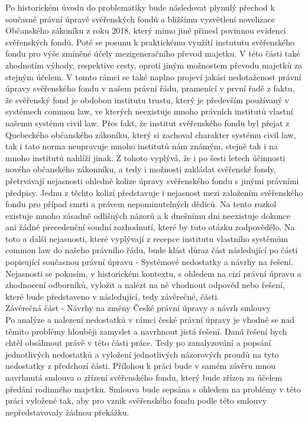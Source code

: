 \documentclass{article}
\begin{document}
Po historickém úvodu do problematiky bude následovat plynulý přechod k současné právní úpravě svěřenských fondů a bližšímu vysvětlení novelizace Občanského zákoníku z roku 2018, který mimo jiné přinesl povinnou evidenci svěřenských fondů. Poté se posunu k praktickému využítí instututu svěřenského fondu pro výše zmíněné účely mezigeneračního převod majetku. V této části také zhodnotím výhody, respektive cesty, oproti jiným možnostem převodu majetků za stejným účelem. V tomto rámci se také naplno projeví jakási nedotaženost právní úpravy svěřenského fondu v našem právní řádu, pramenící v první řadě z faktu, že svěřenský fond je obdobou institutu trustu, který je především používaný v systémech common law, ve kterých neexistuje mnoho právních institutů vlastní našemu systému civil law. Přes fakt, že institut svěřenského fondu byl přejat z Quebeckého občanského zákoníku, který si zachoval charakter systému civil law, tak i tato norma neupravuje mnoho institutů nám známým, stejně tak i na mnoho institutů nahlíží jinak. Z tohoto vyplývá, že i po šesti letech účinnosti nového občanského zákonníku, a tedy i možnosti zakládat svěřenské fondy, přetrvávají nejasnosti ohledně kolize úpravy svěřenského fondu s jinými právními předpisy. Jednu z těchto kolizí představuje i nejasnost mezi založením svěřenského fondu pro případ smrti a právem nepominutelných dědiců. Na tento rozkol existuje mnoho zásadně odlišných názorů a k dnešnímu dni neexistuje dokonce ani žádné precedenční soudní rozhodnutí, které by tuto otázku zodpovědělo. Na toto a další nejasnosti, které vyplývají z recepce institutu vlastního systémům common law do našeho právního řádu, bude klást důraz část následující po části popisující současnou právní úpravu - Systémové nedostatky a návrhy na řešení. Nejasnosti se pokusím, v historickém kontextu, s ohledem na cizí právní úpravu a zhodnocení odborníků, vyložit a nalézt na ně vhodnout odpověď nebo řešení, které bude představeno v následující, tedy závěrečné, části. \\

{\Large Závěrečná část - Návrhy na změny České právní úpravy a návrh smlouvy}\\


Po analýze a nalezení nedostatků v rámci české právní úpravy je vhodné se nad těmito problémy hlouběji zamyslet a navrhnout jistá řešení. Daná řešení bych chtěl obsáhnout právě v této části práce. Tedy po zanalyzování a popsání jednotlivých nedostatků a vyložení jednotlivých názorových proudů na tyto nedostatky z předchozí části. Přílohou k práci bude v samém závěru mnou navrhnutá smlouva o zřízení svěřenského fondu, který bude zřízen za účelem předání rodinného majetku. Smlouva bude sepsána s ohledem na problémy v této práci vyložené tak, aby pro vznik svěřenského fondu podle této smlouvy nepředstavovaly žádnou překážku.
\end{document}
